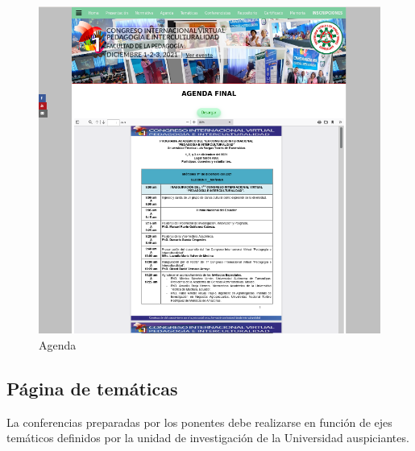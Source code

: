 \documentclass[a4paper,14px]{article}
\begin{document}
\begin{figure}[H]
  \centering
  \includegraphics[scale=0.6]{agenda.png}
  \caption{Agenda}
  \label{fig:arquitectura}
\end{figure}


\newpage
\subsection{Página de temáticas }
\label{sec:pagina-principal}

La conferencias preparadas por los ponentes debe realizarse en función de ejes temáticos definidos por la unidad de investigación de la Universidad auspiciantes.
\end{document}
